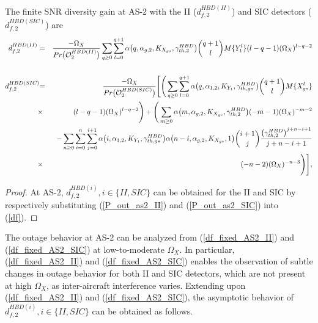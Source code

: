 \begin{theorem}
The finite SNR diversity gain at AS-2 with the II ($d_{f,2}^{HBD(II)}$) and SIC detectors ($d_{f,2}^{HBD(SIC)}$) are
\begin{eqnarray} 
d_{f,2}^{HBD(II)} & = & \frac{-\Omega_X}{Pr\big(\mathcal{O}_{2}^{HBD(II)}\big)} \sum_{q\geq0} \sum_{l=0}^{q+1} \alpha\big(q,\alpha_{g,2}, K_{X_{gs}}, \gamma_{th,2}^{HBD}\big) \binom{q+1}{l} M\{Y_1^l\} (l-q-1) (\Omega_X)^{l-q-2} \label{df_fixed_AS2_II} \nonumber \\
& & \\
d_{f,2}^{HBD(SIC)} \hspace{-0.1cm} & = & \hspace{-0.1cm} \frac{-\Omega_X}{Pr\big(\mathcal{O}_{2}^{HBD(SIC)}\big)} \Bigg[ \Bigg( \sum_{q\geq0}\sum_{l=0}^{q+1} \alpha\big(q,\alpha_{1,2},K_{Y_{1}},\gamma_{th,gs}^{HBD}\big) \binom{q+1}{l} M\{X_{gs}^l\} \nonumber\\
& \times &  (l-q-1) (\Omega_{X})^{l-q-2} \Bigg) + \Bigg( \sum_{m\geq0} \alpha\big(m,\alpha_{g,2},K_{X_{gs}},\gamma_{th,2}^{HBD}\big) (-m-1) (\Omega_{X})^{-m-2} \nonumber \\
& & - \sum_{n\geq0}\sum_{i=0}^{n}\sum_{j=0}^{i+1} \alpha\big(i,\alpha_{1,2},K_{Y_{1}},\gamma_{th,gs}^{HBD}\big) \alpha\big(n-i,\alpha_{g,2},K_{X_{gs}},1\big) \binom{i+1}{j} \frac{\big(\gamma_{th,2}^{HBD}\big)^{j+n-i+1}}{j+n-i+1} \nonumber\\
& \times &  (-n-2) (\Omega_X)^{-n-3} \Bigg) \Bigg], \label{df_fixed_AS2_SIC}
\end{eqnarray}
\end{theorem}
\begin{proof}
At AS-2, $d_{f,2}^{HBD(i)}, i \in \{II,SIC\}$ can be obtained for the II and SIC by respectively substituting (\ref{P_out_as2_II}) and (\ref{P_out_as2_SIC}) into (\ref{df}).
\end{proof}

The outage behavior at AS-2 can be analyzed from (\ref{df_fixed_AS2_II}) and (\ref{df_fixed_AS2_SIC}) at low-to-moderate $\Omega_X$. In particular, (\ref{df_fixed_AS2_II}) and (\ref{df_fixed_AS2_SIC}) enables the observation of subtle changes in outage behavior for both II and SIC detectors, which are not present at high $\Omega_X$, as inter-aircraft interference varies. Extending upon (\ref{df_fixed_AS2_II}) and (\ref{df_fixed_AS2_SIC}), the asymptotic behavior of $d_{f,2}^{HBD(i)}, i \in \{II,SIC\}$ can be obtained as follows.

